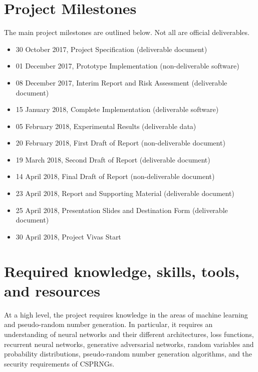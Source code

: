 \documentclass[12pt, titlepage]{article}
\begin{document}
\section{Project Milestones}
The main project milestones are outlined below. Not all are official
deliverables.

\begin{itemize}
  \item 30 October 2017, Project Specification (deliverable document)
  \item 01 December 2017, Prototype Implementation (non-deliverable software)
  \item 08 December 2017, Interim Report and Risk Assessment (deliverable document)
  \item 15 January 2018, Complete Implementation (deliverable software)
  \item 05 February 2018, Experimental Results (deliverable data)
  \item 20 February 2018, First Draft of Report (non-deliverable document)
  \item 19 March 2018, Second Draft of Report (deliverable document)
  \item 14 April 2018, Final Draft of Report (non-deliverable document)
  \item 23 April 2018, Report and Supporting Material (deliverable document)
  \item 25 April 2018, Presentation Slides and Destination Form (deliverable document)
  \item 30 April 2018, Project Vivas Start
\end{itemize}
\clearpage


\section{Required knowledge, skills, tools, and resources}
At a high level, the project requires knowledge in the areas of machine
learning and pseudo-random number generation. In particular, it requires
an understanding of neural networks and their different architectures, loss
functions, recurrent neural networks, generative adversarial networks, random
variables and probability distributions, pseudo-random number generation
algorithms, and the security requirements of CSPRNGs.
\end{document}
